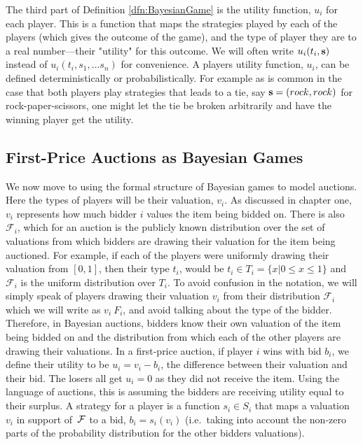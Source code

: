 \documentclass[12pt,twoside]{reedthesis}
\begin{document}
The third part of Definition \ref{dfn:BayesianGame} is the utility function, $u_i$ for each player. This is a function that maps the strategies played by each of the players (which gives the outcome of the game), and the type of player they are to a real number---their "utility" for this outcome. We will often write $u_i(t_i, \textbf{s})$ instead of $u_i(t_i, s_1, \ldots s_n)$ for convenience. A players utility function, $u_i$, can be defined deterministically or probabilistically. For example as is common in the case that both players play strategies that leads to a tie, say $\textbf{s} = (rock, rock)$ for rock-paper-scissors, one might let the tie be broken arbitrarily and have the winning player get the utility.


\subsection{First-Price Auctions as Bayesian Games}
We now move to using the formal structure of Bayesian games to model auctions. Here the types of players will be their valuation, $v_i$. As discussed in chapter one,~$v_i$ represents how much bidder $i$ values the item being bidded on. There is also $\mathcal{F}_i$, which for an auction is the publicly known distribution over the set of valuations from which bidders are drawing their valuation for the item being auctioned. For example, if each of the players were uniformly drawing their valuation from $[0,1]$, then their type $t_i$, would be $t_i \in T_i = \{x | 0 \leq x \leq 1\}$ and $\mathcal{F}_i$ is the uniform distribution over $T_i$. To avoid confusion in the notation, we will simply speak of players drawing their valuation $v_i$ from their distribution $\mathcal{F}_i$ which we will write as $v_i ~ F_i$, and avoid talking about the type of the bidder. Therefore, in Bayesian auctions, bidders know their own valuation of the item being bidded on and the distribution from which each of the other players are drawing their valuations. In a first-price auction, if player $i$ wins with bid $b_i$, we define their utility to be $u_i = v_i - b_i$, the difference between their valuation and their bid. The losers all get $u_i = 0$ as they did not receive the item. Using the language of auctions, this is assuming the bidders are receiving utility equal to their surplus. A strategy for a player is a function $s_i \in S_i$ that maps a valuation $v_i$ in support of~$\mathcal{F}$ to a bid, $b_i = s_i(v_i)$ (i.e.~taking into account the non-zero parts of the probability distribution for the other bidders valuations). 
\end{document}
